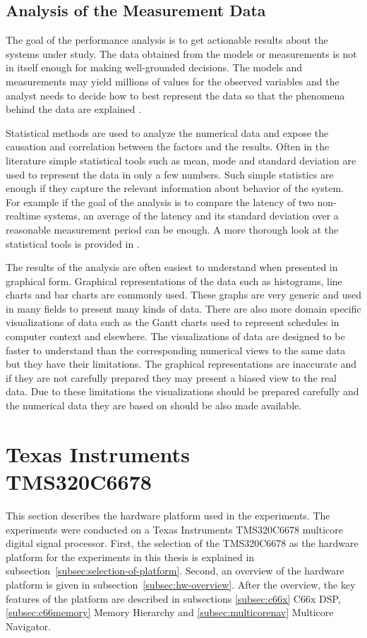 \subsection{Analysis of the Measurement Data}
\label{subsec:data-analysis}
The goal of the performance analysis is to get actionable results about the systems under study. The data obtained from the models or measurements is not in itself enough for making well-grounded decisions. The models and measurements may yield millions of values for the observed variables and the analyst needs to decide how to best represent the data so that the phenomena behind the data are explained \cite{jain1991art}.

Statistical methods are used to analyze the numerical data and expose the causation and correlation between the factors and the results. Often in the literature simple statistical tools such as mean, mode and standard deviation are used to represent the data in only a few numbers. Such simple statistics are enough if they capture the relevant information about behavior of the system. For example if the goal of the analysis is to compare the latency of two non-realtime systems, an average of the latency and its standard deviation over a reasonable measurement period can be enough. A more thorough look at the statistical tools is provided in \cite{jain1991art}.

The results of the analysis are often easiest to understand when presented in graphical form. Graphical representations of the data such as histograms, line charts and bar charts are commonly used. These graphs are very generic and used in many fields to present many kinds of data. There are also more domain specific visualizations of data such as the Gantt charts used to represent schedules in computer context and elsewhere. The visualizations of data are designed to be faster to understand than the corresponding numerical views to the same data but they have their limitations. The graphical representations are inaccurate and if they are not carefully prepared they may present a biased view to the real data. Due to these limitations the visualizations should be prepared carefully and the numerical data they are based on should be also made available.~\cite{jain1991art}

\section[Texas Instruments TMS320C6678]{Texas Instruments\\TMS320C6678}
\label{sec:c6678}
This section describes the hardware platform used in the experiments. The experiments were conducted on a Texas Instruments TMS320C6678 multicore digital signal processor. First, the selection of the TMS320C6678 as the hardware platform for the experiments in this thesis is explained in subsection~\ref{subsec:selection-of-platform}. Second, an overview of the hardware platform is given in subsection~\ref{subsec:hw-overview}. After the overview, the key features of the platform are described in subsections \ref{subsec:c66x} C66x DSP, \ref{subsec:c66memory} Memory Hierarchy and \ref{subsec:multicorenav} Multicore Navigator.


